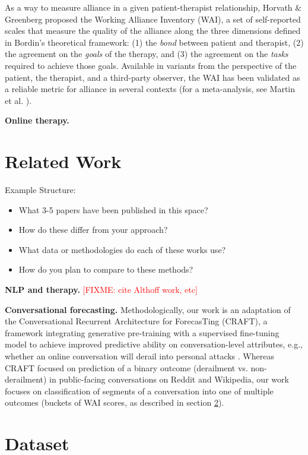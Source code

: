 \documentclass{article}
\newcommand{\fixme}[1]{\textcolor{red}{[FIXME: #1]}}
\begin{document}
As a way to measure alliance in a given patient-therapist relationship, Horvath \& Greenberg \citeyear{horvath1989development} proposed the Working Alliance Inventory (WAI), a set of self-reported scales that measure the quality of the alliance along the three dimensions defined in Bordin's theoretical framework: (1) the \textit{bond} between patient and therapist, (2) the agreement on the \textit{goals} of the therapy, and (3) the agreement on the \textit{tasks} required to achieve those goals. Available in variants from the perspective of the patient, the therapist, and a third-party observer, the WAI has been validated as a reliable metric for alliance in several contexts (for a meta-analysis, see Martin et al. \citeyear{martin2000relation}).

\textbf{Online therapy.}


\section{Related Work}
\label{sec:related-work}

Example Structure:
\begin{itemize}
\item What 3-5 papers have been published in this space?
\item How do these differ from your approach?
\item What data or methodologies do each of these works use?
\item How do you plan to compare to these methods?
\end{itemize}

\textbf{NLP and therapy.} \fixme{cite Althoff work, etc}

\textbf{Conversational forecasting.} Methodologically, our work is an adaptation of the Conversational Recurrent Architecture for ForecasTing (CRAFT), a framework integrating generative pre-training with a supervised fine-tuning model to achieve improved predictive ability on conversation-level attributes, e.g., whether an online conversation will derail into personal attacks \cite{Chang-Trouble:19}. Whereas CRAFT focused on prediction of a binary outcome (derailment vs. non-derailment) in public-facing conversations on Reddit and Wikipedia, our work focuses on classification of segments of a conversation into one of multiple outcomes (buckets of WAI scores, as described in section \ref{sec:dataset}).

\section{Dataset}
\label{sec:dataset}
\end{document}
